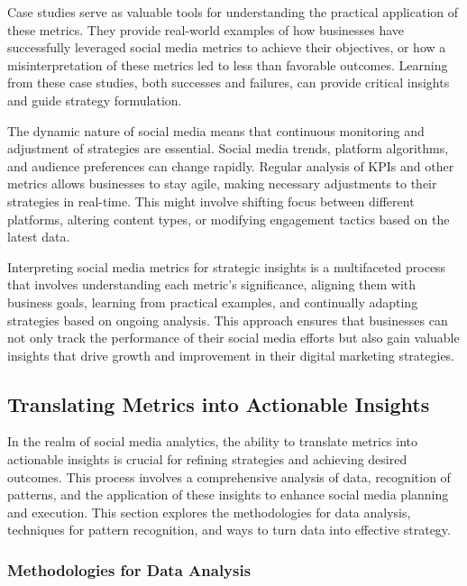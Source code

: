 \documentclass[
]{book}
\begin{document}
Case studies serve as valuable tools for understanding the practical application of these metrics. They provide real-world examples of how businesses have successfully leveraged social media metrics to achieve their objectives, or how a misinterpretation of these metrics led to less than favorable outcomes. Learning from these case studies, both successes and failures, can provide critical insights and guide strategy formulation.

The dynamic nature of social media means that continuous monitoring and adjustment of strategies are essential. Social media trends, platform algorithms, and audience preferences can change rapidly. Regular analysis of KPIs and other metrics allows businesses to stay agile, making necessary adjustments to their strategies in real-time. This might involve shifting focus between different platforms, altering content types, or modifying engagement tactics based on the latest data.

Interpreting social media metrics for strategic insights is a multifaceted process that involves understanding each metric's significance, aligning them with business goals, learning from practical examples, and continually adapting strategies based on ongoing analysis. This approach ensures that businesses can not only track the performance of their social media efforts but also gain valuable insights that drive growth and improvement in their digital marketing strategies.

\hypertarget{translating-metrics-into-actionable-insights}{%
\subsection*{Translating Metrics into Actionable Insights}\label{translating-metrics-into-actionable-insights}}

In the realm of social media analytics, the ability to translate metrics into actionable insights is crucial for refining strategies and achieving desired outcomes. This process involves a comprehensive analysis of data, recognition of patterns, and the application of these insights to enhance social media planning and execution. This section explores the methodologies for data analysis, techniques for pattern recognition, and ways to turn data into effective strategy.

\hypertarget{methodologies-for-data-analysis}{%
\subsubsection*{Methodologies for Data Analysis}\label{methodologies-for-data-analysis}}
\end{document}
